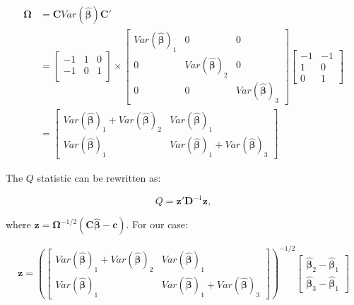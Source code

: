  \begin{equation}
     \begin{split}
         \mathbf{\Omega}  &= \mathbf{C}Var(\mathbf{\hat{\beta}}) \mathbf{C}' \\
         &= \begin{bmatrix} 
      -1 & 1 & 0\\
     -1 & 0 & 1\\
     \end{bmatrix} \times \begin{bmatrix}
         Var(\mathbf{\hat{\beta}})_1 & 0 & 0 \\
         0 & Var(\mathbf{\hat{\beta}})_2 & 0 \\
         0 & 0 & Var(\mathbf{\hat{\beta}})_3
     \end{bmatrix} \begin{bmatrix} 
     -1 & -1 \\
     1 & 0 \\
     0 & 1
     \end{bmatrix} \\
    &= \begin{bmatrix}
        Var(\mathbf{\hat{\beta}})_1 + Var(\mathbf{\hat{\beta}})_2 & Var(\mathbf{\hat{\beta}})_1 \\
        Var(\mathbf{\hat{\beta}})_1 & Var(\mathbf{\hat{\beta}})_1+Var(\mathbf{\hat{\beta}})_3
    \end{bmatrix} 
     \end{split}
 \end{equation}
 
 
 
 
 The $Q$ statistic can be rewritten as: 

 \begin{equation}
     Q = \mathbf{z}'\mathbf{D}^{-1}\mathbf{z}, 
 \end{equation}

 where $\mathbf{z = \mathbf{\Omega}}^{-1/2}(\mathbf{C}\mathbf{\hat{\beta}}-\mathbf{c}) $. For our case: 

 \begin{equation}
     \mathbf{z} = \left(\begin{bmatrix}
        Var(\mathbf{\hat{\beta}})_1 + Var(\mathbf{\hat{\beta}})_2 & Var(\mathbf{\hat{\beta}})_1 \\
        Var(\mathbf{\hat{\beta}})_1 & Var(\mathbf{\hat{\beta}})_1+Var(\mathbf{\hat{\beta}})_3
    \end{bmatrix} \right)^{-1/2} \begin{bmatrix}
         \mathbf{\hat{\beta}}_2 - \mathbf{\hat{\beta}}_1 \\
         \mathbf{\hat{\beta}}_3 - \mathbf{\hat{\beta}}_1
     \end{bmatrix}
 \end{equation}
 
